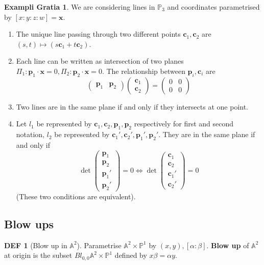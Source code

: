 \documentclass[twocolumn]{article}
\renewcommand{\emph}[1]{{\color{blue!70!black}\sffamily\bfseries #1}}
\newcommand{\A}{\mathbb{A}}
\renewcommand{\P}{\mathbb{P}}
\theoremstyle{definition}
\newtheorem{example}[thm]{Exampli Gratia}
\newtheorem{defi}[thm]{DEF}
\theoremstyle{remark}
\begin{document}
\begin{example}
	We are considering lines in $\P_3$ and coordinates parametrised by $[x:y:z:w] = \bm{x}$.
	\begin{enumerate}
		\item The unique line passing through two different points $\bm{c}_1, \bm{c}_2$ are $(s, t)\mapsto (s\bm{c}_1 + t\bm{c}_2)$.
		\item Each line can be written as intersection of two planes $\Pi_1 : \bm{p}_1 \cdot \bm{x} = 0 , \Pi_2: \bm{p}_2 \cdot \bm{x} = 0$. 
			The relationship between $\bm{p}_i, \bm{c}_i$ are 
			$$
				\begin{pmatrix}
					\bm{p}_1 & \bm{p}_2	
				\end{pmatrix}	
				\begin{pmatrix}
					\bm{c}_1 \\ \bm{c}_2	
				\end{pmatrix} = 
				\begin{pmatrix}
					0 & 0 \\ 0 & 0
				\end{pmatrix}
			$$
		\item Two lines are in the same plane if and only if they intersects at one point.
		\item Let $l_1$ be represented by $\bm{c}_1, \bm{c}_2, \bm{p}_1, \bm{p}_2$ respectively for first and second notation, $l_2$ be represented by $\bm{c}_1', \bm{c}_2', \bm{p}_1', \bm{p}_2'$.
			They are in the same plane if and only if 
			$$
			\det 
			\begin{pmatrix}
				\bm{p}_1 \\ \bm{p}_2\\
				\bm{p}_1'\\ \bm{p}_2'
			\end{pmatrix} = 0
			\iff 
			\det 
			\begin{pmatrix}
				\bm{c}_1 \\ \bm{c}_2\\
				\bm{c}_1'\\ \bm{c}_2'
			\end{pmatrix} = 0
			$$
			(These two conditions are equivalent).
	\end{enumerate}
\end{example}

\subsection{Blow ups}

\begin{defi}[Blow up in $\A^2$]
	Parametrise $\A^2 \times \P^1$ by $(x,y), [\alpha: \beta]$. \emph{Blow up} of $\A^2$ at origin is the subset $Bl_{0,0} \A^2 \times \P^1$ defined by $x \beta = \alpha y$.
\end{defi}
\end{document}

